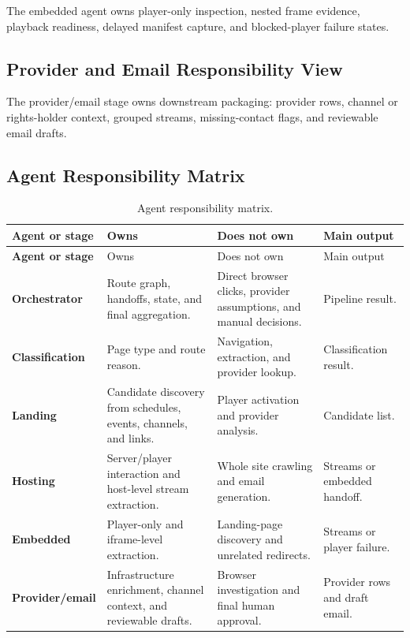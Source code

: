 

The embedded agent owns player-only inspection, nested frame evidence,
playback readiness, delayed manifest capture, and blocked-player failure
states.

\subsection{Provider and Email Responsibility View}



The provider/email stage owns downstream packaging: provider rows, channel or
rights-holder context, grouped streams, missing-contact flags, and reviewable
email drafts.

\subsection{Agent Responsibility Matrix}

\begin{longtable}{>{\raggedright\arraybackslash\bfseries}p{3.0cm}
                  >{\raggedright\arraybackslash}p{4.1cm}
                  >{\raggedright\arraybackslash}p{4.1cm}
                  >{\raggedright\arraybackslash}p{2.7cm}}
\caption{Agent responsibility matrix.}
\label{tab:detailed-agent-responsibility-matrix}\\
\toprule
\rowcolor{accent!8}
Agent or stage & Owns & Does not own & Main output \\
\midrule
\endfirsthead
\toprule
\rowcolor{accent!8}
Agent or stage & Owns & Does not own & Main output \\
\midrule
\endhead
\bottomrule
\endfoot
Orchestrator & Route graph, handoffs, state, and final aggregation. & Direct
browser clicks, provider assumptions, and manual decisions. & Pipeline result. \\
Classification & Page type and route reason. & Navigation, extraction, and
provider lookup. & Classification result. \\
Landing & Candidate discovery from schedules, events, channels, and links. &
Player activation and provider analysis. & Candidate list. \\
Hosting & Server/player interaction and host-level stream extraction. & Whole
site crawling and email generation. & Streams or embedded handoff. \\
Embedded & Player-only and iframe-level extraction. & Landing-page discovery
and unrelated redirects. & Streams or player failure. \\
Provider/email & Infrastructure enrichment, channel context, and reviewable
drafts. & Browser investigation and final human approval. & Provider rows and
draft email. \\
\end{longtable}

